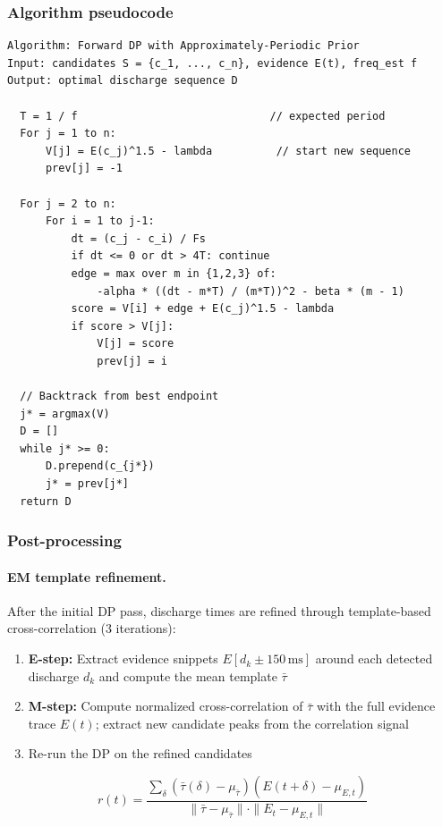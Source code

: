 \subsubsection{Algorithm pseudocode}

\begin{verbatim}
Algorithm: Forward DP with Approximately-Periodic Prior
Input: candidates S = {c_1, ..., c_n}, evidence E(t), freq_est f
Output: optimal discharge sequence D

  T = 1 / f                              // expected period
  For j = 1 to n:
      V[j] = E(c_j)^1.5 - lambda          // start new sequence
      prev[j] = -1

  For j = 2 to n:
      For i = 1 to j-1:
          dt = (c_j - c_i) / Fs
          if dt <= 0 or dt > 4T: continue
          edge = max over m in {1,2,3} of:
              -alpha * ((dt - m*T) / (m*T))^2 - beta * (m - 1)
          score = V[i] + edge + E(c_j)^1.5 - lambda
          if score > V[j]:
              V[j] = score
              prev[j] = i

  // Backtrack from best endpoint
  j* = argmax(V)
  D = []
  while j* >= 0:
      D.prepend(c_{j*})
      j* = prev[j*]
  return D
\end{verbatim}

\subsubsection{Post-processing}

\paragraph{EM template refinement.}
After the initial DP pass, discharge times are refined through template-based cross-correlation (3 iterations):
\begin{enumerate}
  \item \textbf{E-step:} Extract evidence snippets $E[d_k \pm 150\,\text{ms}]$ around each detected discharge $d_k$ and compute the mean template $\bar{\tau}$
  \item \textbf{M-step:} Compute normalized cross-correlation of $\bar{\tau}$ with the full evidence trace $E(t)$; extract new candidate peaks from the correlation signal
  \item Re-run the DP on the refined candidates
\end{enumerate}
\[ r(t) = \frac{\sum_{\delta} (\bar{\tau}(\delta) - \mu_{\bar{\tau}})(E(t + \delta) - \mu_{E,t})}{\|\bar{\tau} - \mu_{\bar{\tau}}\| \cdot \|E_t - \mu_{E,t}\|} \tag{10} \]


